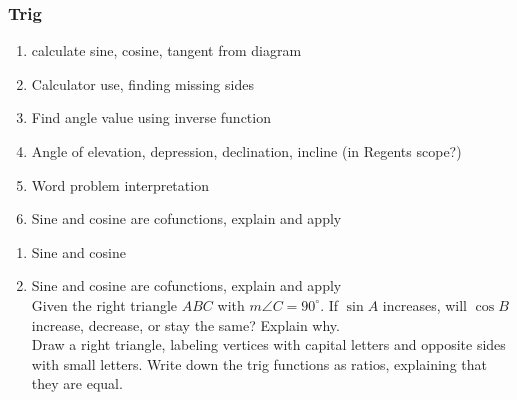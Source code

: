 \documentclass[12pt, twoside]{article}
\begin{document}
\subsubsection*{Trig}
  \begin{enumerate}
  \item calculate sine, cosine, tangent from diagram
  \item Calculator use, finding missing sides
  \item Find angle value using inverse function
  \item Angle of elevation, depression, declination, incline (in Regents scope?)
  \item Word problem interpretation
  \item Sine and cosine are cofunctions, explain and apply
  \end{enumerate}

  \begin{enumerate}
    \subsubsection*{Diagrams}
    \item Sine and cosine

  \item Sine and cosine are cofunctions, explain and apply\\
  Given the right triangle $ABC$ with $m\angle C=90^\circ$. If $\sin A$ increases, will $\cos B$ increase, decrease, or stay the same? Explain why.\\
  Draw a right triangle, labeling vertices with capital letters and opposite sides with small letters. Write down the trig functions as ratios, explaining that they are equal.
  \end{enumerate}
\end{document}
